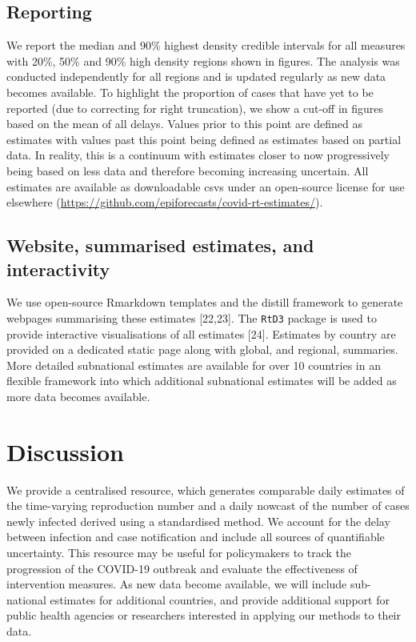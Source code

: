 \documentclass[
]{article}
\begin{document}
\hypertarget{reporting}{%
\subsection{Reporting}\label{reporting}}

We report the median and 90\% highest density credible intervals for all
measures with 20\%, 50\% and 90\% high density regions shown in figures.
The analysis was conducted independently for all regions and is updated
regularly as new data becomes available. To highlight the proportion of
cases that have yet to be reported (due to correcting for right
truncation), we show a cut-off in figures based on the mean of all
delays. Values prior to this point are defined as estimates with values
past this point being defined as estimates based on partial data. In
reality, this is a continuum with estimates closer to now progressively
being based on less data and therefore becoming increasing uncertain.
All estimates are available as downloadable csvs under an open-source
license for use elsewhere
(\url{https://github.com/epiforecasts/covid-rt-estimates/}).

\hypertarget{website-summarised-estimates-and-interactivity}{%
\subsection{Website, summarised estimates, and
interactivity}\label{website-summarised-estimates-and-interactivity}}

We use open-source Rmarkdown templates and the distill framework to
generate webpages summarising these estimates {[}22,23{]}. The
\texttt{RtD3} package is used to provide interactive visualisations of
all estimates {[}24{]}. Estimates by country are provided on a dedicated
static page along with global, and regional, summaries. More detailed
subnational estimates are available for over 10 countries in an flexible
framework into which additional subnational estimates will be added as
more data becomes available.

\hypertarget{discussion}{%
\section{Discussion}\label{discussion}}

We provide a centralised resource, which generates comparable daily
estimates of the time-varying reproduction number and a daily nowcast of
the number of cases newly infected derived using a standardised method.
We account for the delay between infection and case notification and
include all sources of quantifiable uncertainty. This resource may be
useful for policymakers to track the progression of the COVID-19
outbreak and evaluate the effectiveness of intervention measures. As new
data become available, we will include sub-national estimates for
additional countries, and provide additional support for public health
agencies or researchers interested in applying our methods to their
data.
\end{document}
